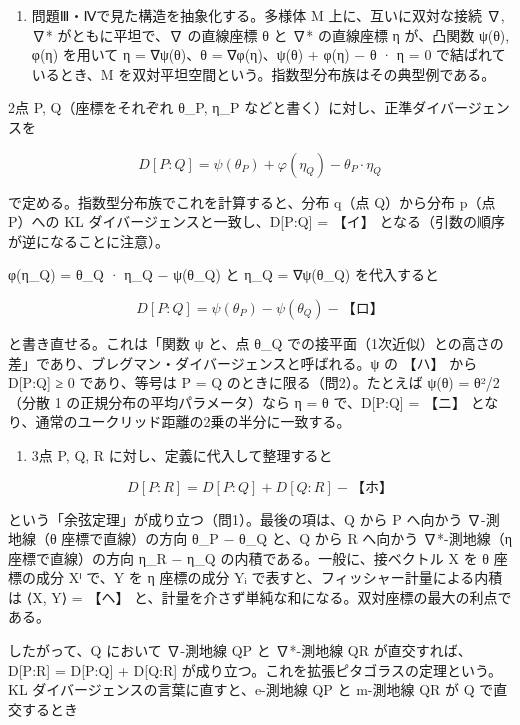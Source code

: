 \documentclass[
  10pt,
  a4paper,
]{article}
\providecommand{\tightlist}{%
  \setlength{\itemsep}{0pt}\setlength{\parskip}{0pt}}
\begin{document}
\begin{enumerate}
\def\labelenumi{(\arabic{enumi})}
\tightlist
\item
  問題Ⅲ・Ⅳで見た構造を抽象化する。多様体 M 上に、互いに双対な接続 ∇, ∇*
  がともに平坦で、∇ の直線座標 θ と ∇* の直線座標 η が、凸関数 ψ(θ),
  φ(η) を用いて η = ∇ψ(θ)、θ = ∇φ(η)、ψ(θ) + φ(η) − θ · η = 0
  で結ばれているとき、M
  を双対平坦空間という。指数型分布族はその典型例である。
\end{enumerate}

2点 P, Q（座標をそれぞれ θ\_P, η\_P
などと書く）に対し、正準ダイバージェンスを

\[D[P:Q] = \psi(\theta_P) + \varphi(\eta_Q) - \theta_P \cdot \eta_Q\]

で定める。指数型分布族でこれを計算すると、分布 q（点 Q）から分布 p（点
P）への KL ダイバージェンスと一致し、D{[}P:Q{]} = 【イ】
となる（引数の順序が逆になることに注意）。

φ(η\_Q) = θ\_Q · η\_Q − ψ(θ\_Q) と η\_Q = ∇ψ(θ\_Q) を代入すると

\[D[P:Q] = \psi(\theta_P) - \psi(\theta_Q) - \text{【ロ】}\]

と書き直せる。これは「関数 ψ と、点 θ\_Q
での接平面（1次近似）との高さの差」であり、ブレグマン・ダイバージェンスと呼ばれる。ψ
の 【ハ】 から D{[}P:Q{]} ≥ 0 であり、等号は P = Q
のときに限る（問2）。たとえば ψ(θ) = \textbar θ\textbar²/2（分散 1
の正規分布の平均パラメータ）なら η = θ で、D{[}P:Q{]} = 【ニ】
となり、通常のユークリッド距離の2乗の半分に一致する。

\begin{enumerate}
\def\labelenumi{(\arabic{enumi})}
\setcounter{enumi}{1}
\tightlist
\item
  3点 P, Q, R に対し、定義に代入して整理すると
\end{enumerate}

\[D[P:R] = D[P:Q] + D[Q:R] - \text{【ホ】}\]

という「余弦定理」が成り立つ（問1）。最後の項は、Q から P へ向かう
∇-測地線（θ 座標で直線）の方向 θ\_P − θ\_Q と、Q から R へ向かう
∇*-測地線（η 座標で直線）の方向 η\_R − η\_Q
の内積である。一般に、接ベクトル X を θ 座標の成分 X{\fallbackfont ⁱ}
で、Y を η 座標の成分 Y{\fallbackfont ᵢ}
で表すと、フィッシャー計量による内積は {\fallbackfont ⟨}X,
Y{\fallbackfont ⟩} = 【ヘ】
と、計量を介さず単純な和になる。双対座標の最大の利点である。

したがって、Q において ∇-測地線 QP と ∇*-測地線 QR
が直交すれば、D{[}P:R{]} = D{[}P:Q{]} + D{[}Q:R{]}
が成り立つ。これを拡張ピタゴラスの定理という。KL
ダイバージェンスの言葉に直すと、e-測地線 QP と m-測地線 QR が Q
で直交するとき
\end{document}
